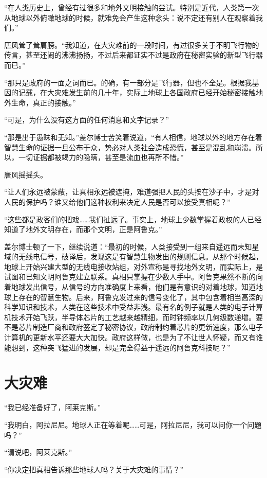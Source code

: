 “在人类历史上，曾经有过很多和地外文明接触的尝试。特别是近代，人类第一次从地球以外俯瞰地球的时候，就难免会产生这种念头：说不定还有别人在观察着我们。”

唐风耸了耸肩膀。“我知道，在大灾难前的一段时间，有过很多关于不明飞行物的传言，甚至还闹的沸沸扬扬，不过后来都证实不过是政府在秘密实验的新型飞行器而已。”

“那只是政府的一面之词而已。的确，有一部分是飞行器，但也不全是。根据我基因的记载，在大灾难发生前的几十年，实际上地球上各国政府已经开始秘密接触地外生命，真正的接触。”

“可是，为什么没有这方面的任何消息和文字记录？”

“那是出于愚昧和无知。”盖尔博士苦笑着说道，“有人相信，地球以外的地方存在着智慧生命的证据一旦公布于众，势必对人类社会造成恐慌，甚至是混乱和崩溃。所以，一切证据都被竭力的隐瞒，甚至是流血也再所不惜。”

唐风摇摇头。

“让人们永远被蒙蔽，让真相永远被遮掩，难道强把人民的头按在沙子中，才是对人民的保护吗？谁又给他们这种权利来决定人民是否可以接受真相呢？”

“这些都是政客们的把戏……我们扯远了。事实上，地球上少数掌握着政权的人已经知道了地外文明存在，而那个文明，正是阿鲁克。”

盖尔博士顿了一下，继续说道：“最初的时候，人类接受到一组来自遥远而未知星域的无线电信号，破译后，发现这是有智慧生物发出的规则信息。从那个时候起，地球上开始兴建大型的无线电接收站组，对外宣称是寻找地外文明，而实际上，是试图和已知文明阿鲁克建立联系。真相只掌握在少数人手中。阿鲁克果然不断的向着地球发出信号，从信号的方向准确度上来看，他们是有意识的对着地球，知道地球上存在的智慧生物。后来，阿鲁克发过来的信号变化了，其中包含着相当高深的科学知识和技术，人类在这些技术中受益非浅。最有名的例子就是人类的电子计算机技术开始飞跃，半导体芯片的工艺越来越精细，而时钟频率以几何级数递增。要不是芯片制造厂商和政府签定了秘密协议，政府制约着芯片的更新速度，那么电子计算机的更新水平还要大大加快。政府这样做，也是为了不让世人怀疑，而又有谁能想到，这种突飞猛进的发展，却是完全得益于遥远的阿鲁克科技呢？”

\chapter{大灾难}

“我已经准备好了，阿莱克斯。”

“我明白，阿拉尼尼。地球人正在等着呢……可是，阿拉尼尼，我可以问你一个问题吗？”

“请说吧，阿莱克斯。”

“你决定把真相告诉那些地球人吗？关于大灾难的事情？”


